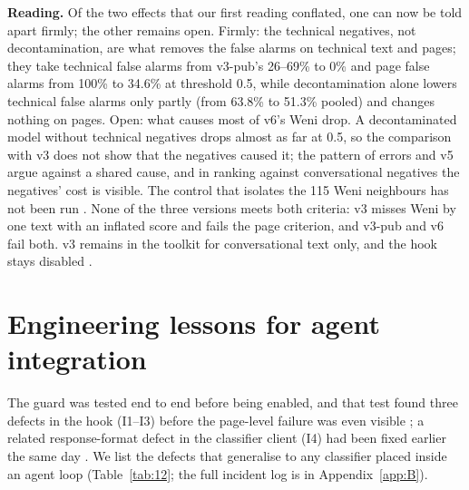 \documentclass[11pt]{article}
\begin{document}
\textbf{Reading.} Of the two effects that our first reading conflated, one can now be told apart firmly; the other remains open. Firmly: the technical negatives, not decontamination, are what removes the false alarms on technical text and pages; they take technical false alarms from v3-pub's 26–69\% to 0\% and page false alarms from 100\% to 34.6\% at threshold 0.5, while decontamination alone lowers technical false alarms only partly (from 63.8\% to 51.3\% pooled) and changes nothing on pages. Open: what causes most of v6's Weni drop. A decontaminated model without technical negatives drops almost as far at 0.5, so the comparison with v3 does not show that the negatives caused it; the pattern of errors and v5 argue against a shared cause, and in ranking against conversational negatives the negatives' cost is visible. The control that isolates the 115 Weni neighbours has not been run%
. None of the three versions meets both criteria: v3 misses Weni by one text with an inflated score and fails the page criterion, and v3-pub and v6 fail both. v3 remains in the toolkit for conversational text only, and the hook stays disabled%
.

\section{Engineering lessons for agent integration}\label{sec:8}

The guard was tested end to end before being enabled, and that test found three defects in the hook (I1–I3) before the page-level failure was even visible%
; a related response-format defect in the classifier client (I4) had been fixed earlier the same day%
. We list the defects that generalise to any classifier placed inside an agent loop (Table~\ref{tab:12}; the full incident log is in Appendix~\ref{app:B}).
\end{document}
